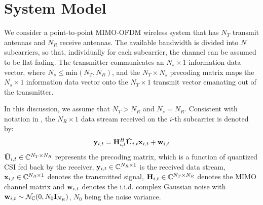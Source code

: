 \documentclass[conference]{IEEEtran}
\begin{document}
\section{System Model}
\label{section2}
\noindent We consider a point-to-point MIMO-OFDM wireless system that
has $N_T$ transmit antennas and $N_R$ receive antennas.
The available bandwidth is divided into $N$ subcarriers, so that, individually for each subcarrier, the channel can be assumed to be flat fading.
The transmitter communicates an $N_s \times 1$ information data vector, where $N_s \leq \text{min}(N_T,N_R)$, and the $N_T \times N_s$ precoding matrix maps the $N_s \times 1$ information data vector onto the $N_T \times 1$ transmit vector emanating out of the transmitter.

In this discussion, we assume that $N_T > N_R$ and $N_s = N_R$.
Consistent with notation in \cite{6891198,Gupt1905:Predictive}, the $N_R \times 1$ data stream received on the $i$-th subcarrier is denoted by:
\begin{equation}
{\bf y}_{i,t}={\bf H}^{H}_{i,t}\tilde{{\bf U}}_{i,t}{\bf x}_{i,t}+ {\bf w}_{i,t}
\end{equation}
$\tilde{{\bf U}}_{i,t} \in \mathbb{C}^{N_T \times N_R}$ represents the precoding matrix, which is a function of quantized CSI fed back by the receiver, ${\bf y}_{i,t} \in \mathbb{C}^{N_R \times 1}$ is the received data stream, ${\bf x}_{i,t} \in \mathbb{C}^{N_R \times 1}$ denotes the transmitted signal, ${\bf H}_{i,t} \in \mathbb{C}^{N_T \times N_R}$ denotes the MIMO channel matrix and ${\bf w}_{i,t}$ denotes the i.i.d. complex Gaussian noise with ${\bf w}_{i,t} \sim \mathcal{N}_{\mathbb{C}}(0,N_0{\bf I}_{N_R})$, $N_0$ being the noise variance.

\end{document}
